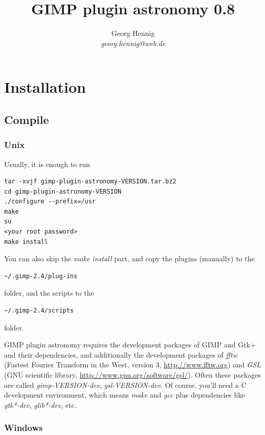 \documentclass[a4paper]{article}
\title{GIMP plugin astronomy 0.8}
\author{Georg Hennig \\ \emph{georg.hennig@web.de}}
\begin{document}
\maketitle

\newpage

\tableofcontents

\newpage

\section{Installation}

\subsection{Compile}

\subsubsection{Unix}

Usually, it is enough to run
\begin{verbatim}
tar -xvjf gimp-plugin-astronomy-VERSION.tar.bz2
cd gimp-plugin-astronomy-VERSION
./configure --prefix=/usr
make
su
<your root password>
make install
\end{verbatim}

You can also skip the \emph{make install} part, and copy the plugins (manually) to the
\begin{verbatim}~/.gimp-2.4/plug-ins\end{verbatim}
folder, and the scripts to the
\begin{verbatim}~/.gimp-2.4/scripts\end{verbatim}
folder.

GIMP plugin astronomy requires the development packages of GIMP and Gtk+ and their dependencies,
and additionally the development packages of \emph{fftw} (Fastest Fourier Transform in the West, version 3, \url{http://www.fftw.org}) and \emph{GSL} (GNU scientific library, \url{http://www.gnu.org/software/gsl/}).
Often these packages are called \emph{gimp-VERSION-dev}, \emph{gsl-VERSION-dev}. Of course, you'll need a C development environment, which means \emph{make} and \emph{gcc} plus dependencies like \emph{gtk*-dev}, \emph{glib*-dev}, etc.

\subsubsection{Windows}
\end{document}
